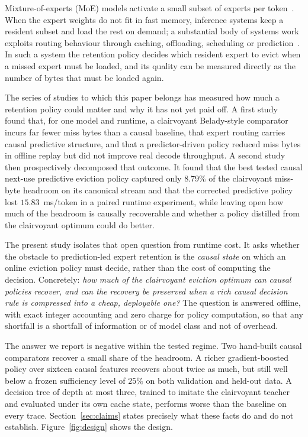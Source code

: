 \documentclass[11pt]{article}
\theoremstyle{plain}
\theoremstyle{definition}
\begin{document}
Mixture-of-experts (MoE) models activate a small subset of experts per token~\cite{shazeer2017sparsely,fedus2022switch}. When the expert weights do not fit in fast memory, inference systems keep a resident subset and load the rest on demand; a substantial body of systems work exploits routing behaviour through caching, offloading, scheduling or prediction~\cite{eliseev2023offloading,xue2025moeinfinity,kamahori2025fiddler,promoe2025,layerscope2025,expertflow2026}. In such a system the retention policy decides which resident expert to evict when a missed expert must be loaded, and its quality can be measured directly as the number of bytes that must be loaded again.

The series of studies to which this paper belongs has measured how much a retention policy could matter and why it has not yet paid off. A first study~\cite{argine2paper} found that, for one model and runtime, a clairvoyant Belady-style comparator~\cite{belady1966replacement} incurs far fewer miss bytes than a causal baseline, that expert routing carries causal predictive structure, and that a predictor-driven policy reduced miss bytes in offline replay but did not improve real decode throughput. A second study~\cite{argine3paper} then prospectively decomposed that outcome. It found that the best tested causal next-use predictive eviction policy captured only $8.79\%$ of the clairvoyant miss-byte headroom on its canonical stream and that the corrected predictive policy lost $15.83$~ms/token in a paired runtime experiment, while leaving open how much of the headroom is causally recoverable and whether a policy distilled from the clairvoyant optimum could do better.

The present study isolates that open question from runtime cost. It asks whether the obstacle to prediction-led expert retention is the \emph{causal state} on which an online eviction policy must decide, rather than the cost of computing the decision. Concretely: \emph{how much of the clairvoyant eviction optimum can causal policies recover, and can the recovery be preserved when a rich causal decision rule is compressed into a cheap, deployable one?} The question is answered offline, with exact integer accounting and zero charge for policy computation, so that any shortfall is a shortfall of information or of model class and not of overhead.

The answer we report is negative within the tested regime. Two hand-built causal comparators recover a small share of the headroom. A richer gradient-boosted policy over sixteen causal features recovers about twice as much, but still well below a frozen sufficiency level of $25\%$ on both validation and held-out data. A decision tree of depth at most three, trained to imitate the clairvoyant teacher and evaluated under its own cache state, performs worse than the baseline on every trace. Section~\ref{sec:claims} states precisely what these facts do and do not establish. Figure~\ref{fig:design} shows the design.
\end{document}

